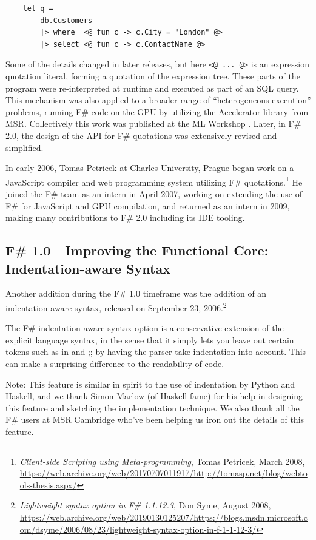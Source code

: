 \documentclass[acmsmall]{acmart}\settopmatter{}
\begin{document}
\begin{verbatim}
    let q =
        db.Customers
        |> where  <@ fun c -> c.City = "London" @> 
        |> select <@ fun c -> c.ContactName @>
\end{verbatim}
Some of the details changed in later releases, but here \verb$<@ ... @>$ is an expression quotation literal, forming a quotation of the expression tree. These parts of the program were re-interpreted at runtime and executed as part of an SQL query.  This mechanism was also applied to a broader range of “heterogeneous execution” problems, running F\# code on the GPU by utilizing the Accelerator library from MSR. Collectively this work was published at the ML Workshop \citep{Syme2006a}. Later, in F\# 2.0, the design of the API for F\# quotations was extensively revised and simplified.

In early 2006, Tomas Petricek at Charles University, Prague began work on a JavaScript compiler and web programming
system utilizing F\# quotations.\footnote{\textit{Client-side Scripting using Meta-programming}, Tomas Petricek, March 2008, \url{https://web.archive.org/web/20170707011917/http://tomasp.net/blog/webtools-thesis.aspx/}}  He
joined the F\# team as an intern in April 2007, working on extending the use of F\# for JavaScript and GPU compilation,
and returned as an intern in 2009, making many contributions to F\# 2.0 including its IDE tooling.

\subsection*{F\# 1.0---Improving the Functional Core: Indentation-aware Syntax}

Another addition during the F\# 1.0 timeframe was the addition of an indentation-aware syntax, released on
September 23, 2006.\footnote{\textit{Lightweight syntax option in F\# 1.1.12.3}, Don Syme, August 2008, \url{https://web.archive.org/web/20190130125207/https://blogs.msdn.microsoft.com/dsyme/2006/08/23/lightweight-syntax-option-in-f-1-1-12-3/}}

\begin{verbquote}
The F# indentation-aware syntax option is a conservative extension of the explicit language syntax, in the sense that it simply lets you leave out certain tokens such as in and ;; by having the parser take indentation into account. This can make a surprising difference to the readability of code. 

Note: This feature is similar in spirit to the use of indentation by Python and Haskell, and we thank Simon Marlow (of Haskell fame) for his help in designing this feature and sketching the implementation technique. We also thank all the F# users at MSR Cambridge who've been helping us iron out the details of this feature. 
\end{verbquote}
\end{document}
